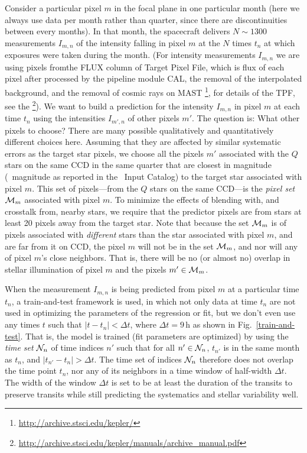 Consider a particular pixel $m$ in the focal plane in one particular month (here we always use data per month rather than quarter,  since there are discontinuities between every months).
In that month, the spacecraft delivers $N\sim 1300$ measurements $I_{m,n}$ of the intensity falling in pixel $m$ at the $N$ times $t_n$ at which exposures were taken during the month.
(For intensity measurements $I_{m,n}$ we are using pixels fromthe FLUX column of Target Pixel File, which is flux of each pixel after processed by the pipeline module CAL, the removal of the interpolated background, and the removal of cosmic rays on MAST
  \footnote{\url{http://archive.stsci.edu/kepler/}}, for details of the TPF, 
  see the  
  \footnote{\url{http://archive.stsci.edu/kepler/manuals/archive_manual.pdf}}).
We want to build a prediction for the intensity $I_{m,n}$ in pixel $m$ at each time $t_n$
  using the intensities $I_{m',n}$ of other pixels $m'$.
The question is:  What other pixels to choose?
There are many possible qualitatively and quantitatively different choices here.
Assuming that they are affected by similar systematic errors as the target star pixels, 
  we choose all the pixels $m'$ associated with the $Q$ stars on the same CCD in the same quarter that are closest in magnitude
  (\Kepler\ magnitude as reported in the \Kepler\ Input Catalog)
  to the target star associated with pixel $m$.
This set of pixels---from the $Q$ stars on the same CCD---is the \emph{pixel set} $\mathcal{M}_m$ associated with pixel $m$.
To minimize the effects of blending with, and crosstalk from, nearby stars, we require that the predictor pixels are from stars at least 20 pixels away from the target star.
Note that because the set $\mathcal{M}_m$ is of pixels associated with \emph{different} stars
  than the star associated with pixel $m$, and are far from it on CCD, 
  the pixel $m$ will not be in the set $\mathcal{M}_m$,
  and nor will any of pixel $m$'s close neighbors.
That is, there will be no (or almost no) overlap in stellar illumination of pixel $m$
  and the pixels $m'\in\mathcal{M}_m$.

When the measurement $I_{m,n}$ is being predicted from pixel $m$ at a particular time $t_n$,
  a train-and-test framework is used, in which not only
  data at time $t_n$ are not used in optimizing the parameters of the regression or fit,
  but we don't even use any times $t$ such that $|t-t_n| < \Delta t$,
  where $\Delta t=9$\,h as shown in Fig.~\ref{train-and-test}.
That is, the model is trained (fit parameters are optimized) by using the \emph{time set} $\mathcal{N}_n$ of time
  indices $n'$ such that for all $n'\in\mathcal{N}_n$,
  $t_{n'}$ is in the same month as $t_n$,
  and $|t_{n'} - t_n|>\Delta t$.
The time set of indices $\mathcal{N}_n$ therefore does not overlap the time point $t_n$,
  nor any of its neighbors in a time window of half-width $\Delta t$. 
The width of the window $\Delta t$ is set to be at least the duration of the transits to preserve transits while still predicting the systematics and stellar variability well.
  
